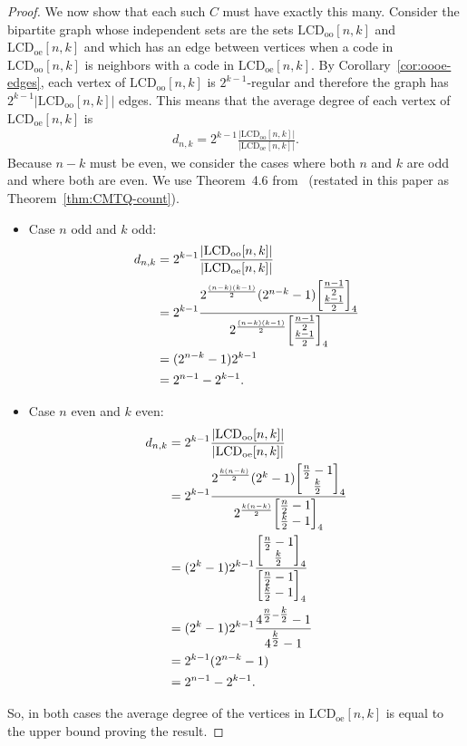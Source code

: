 \documentclass[11pt]{article}
\theoremstyle{definition}
\newcommand{\Qbinom}[3]{{\begin{bmatrix} #1 \\ #2 \end{bmatrix}}_{#3}} %
\newcommand{\Abs}[1]{\left|#1\right|}
\newcommand{\LCDoo}[2]{\mathrm{LCD}_{\mathrm{oo}} [#1, #2]}
\newcommand{\LCDoe}[2]{\mathrm{LCD}_{\mathrm{oe}} [#1, #2]}
\begin{document}
\begin{proof}
	We now show that each such $C$ must have exactly this many.
	Consider the bipartite graph whose independent sets are the sets $\LCDoo{n}{k}$ and $\LCDoe{n}{k}$ and which has an edge between vertices when a code in $\LCDoo{n}{k}$ is neighbors with a code in $\LCDoe{n}{k}$.
	By Corollary~\ref{cor:oooe-edges}, each vertex of $\LCDoo{n}{k}$ is $2^{k - 1}$-regular and therefore the graph has $2^{k - 1} \Abs{\LCDoo{n}{k}}$ edges.
	This means that the average degree of each vertex of $\LCDoe{n}{k}$ is
	\begin{align*}
		d_{n, k} = 2^{k - 1} \frac{\Abs{\LCDoo{n}{k}}}{\Abs{\LCDoe{n}{k}}}.
	\end{align*}
	Because $n - k$ must be even, we consider the cases where both $n$ and $k$ are odd and where both are even.
	We use Theorem~4.6 from~\cite{CMTQ18} (restated in this paper as Theorem~\ref{thm:CMTQ-count}).
	\begin{itemize}
		\item Case $n$ odd and $k$ odd:
			\begin{align*}
				d_{n, k}
				&= 2^{k - 1} \frac{\Abs{\LCDoo{n}{k}}}{\Abs{\LCDoe{n}{k}}} \\
				&= 2^{k - 1} \frac{%
					2^{\frac{(n - k)(k - 1)}{2}}
					(2^{n - k} - 1)
					\Qbinom{\tfrac{n - 1}{2}}{\tfrac{k - 1}{2}}{4}
				}{%
					2^{\frac{(n - k)(k - 1)}{2}}
					\Qbinom{\tfrac{n - 1}{2}}{\tfrac{k - 1}{2}}{4}
				} \\
				&= (2^{n - k} - 1) 2^{k - 1} \\
				&= 2^{n - 1} - 2^{k - 1}.
			\end{align*}
		\item Case $n$ even and $k$ even:
			\begin{align*}
				d_{n, k}
				&= 2^{k - 1} \frac{\Abs{\LCDoo{n}{k}}}{\Abs{\LCDoe{n}{k}}} \\
				&= 2^{k - 1} \frac{%
					2^{\frac{k (n - k)}{2}}
					(2^k - 1)
					\Qbinom{\tfrac{n}{2} - 1}{\tfrac{k}{2}}{4}
				}{%
					2^{\frac{k (n - k)}{2}}
					\Qbinom{\tfrac{n}{2} - 1}{\tfrac{k}{2} - 1}{4}
				} \\
				&= (2^k - 1) 2^{k - 1} \frac{%
					\Qbinom{\tfrac{n}{2} - 1}{\tfrac{k}{2}}{4}
				}{%
					\Qbinom{\tfrac{n}{2} - 1}{\tfrac{k}{2} - 1}{4}
				} \\
				&= (2^k - 1) 2^{k - 1} \frac{%
					4^{\tfrac{n}{2} - \tfrac{k}{2}} - 1
				}{%
					4^{\tfrac{k}{2}} - 1
				} \\
				&= 2^{k - 1} (2^{n - k} - 1) \\
				&= 2^{n - 1} - 2^{k - 1}.
			\end{align*}
	\end{itemize}
	So, in both cases the average degree of the vertices in $\LCDoe{n}{k}$ is equal to the upper bound proving the result.
\end{proof}
\end{document}
